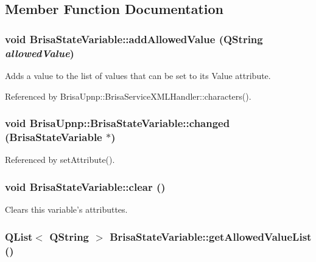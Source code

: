 \subsection{Member Function Documentation}
\hypertarget{classBrisaUpnp_1_1BrisaStateVariable_ae3acf52298795f54b76cd2de0731a6f2}{
\subsubsection[{addAllowedValue}]{\setlength{\rightskip}{0pt plus 5cm}void BrisaStateVariable::addAllowedValue (QString {\em allowedValue})}}
\label{classBrisaUpnp_1_1BrisaStateVariable_ae3acf52298795f54b76cd2de0731a6f2}


Adds a value to the list of values that can be set to its Value attribute. 

Referenced by BrisaUpnp::BrisaServiceXMLHandler::characters().\hypertarget{classBrisaUpnp_1_1BrisaStateVariable_a3d606a92019f38c88d6cb27afc21814c}{
\subsubsection[{changed}]{\setlength{\rightskip}{0pt plus 5cm}void BrisaUpnp::BrisaStateVariable::changed ({\bf BrisaStateVariable} $\ast$)}}
\label{classBrisaUpnp_1_1BrisaStateVariable_a3d606a92019f38c88d6cb27afc21814c}


Referenced by setAttribute().\hypertarget{classBrisaUpnp_1_1BrisaStateVariable_a44e2e9d0545fddce098694a8d824b212}{
\subsubsection[{clear}]{\setlength{\rightskip}{0pt plus 5cm}void BrisaStateVariable::clear ()}}
\label{classBrisaUpnp_1_1BrisaStateVariable_a44e2e9d0545fddce098694a8d824b212}


Clears this variable's attributtes. \hypertarget{classBrisaUpnp_1_1BrisaStateVariable_a47dbb6806ce07fc43d4a804f3ce68de3}{
\subsubsection[{getAllowedValueList}]{\setlength{\rightskip}{0pt plus 5cm}QList$<$ QString $>$ BrisaStateVariable::getAllowedValueList ()}}
\label{classBrisaUpnp_1_1BrisaStateVariable_a47dbb6806ce07fc43d4a804f3ce68de3}


